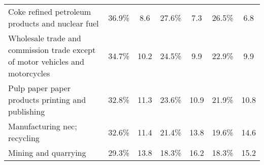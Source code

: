 \documentclass[10pt]{article}
\begin{document}
\begin{table}[!h]
{\begin{tabular}{l|cc|cc|cc}
\rowcolor[HTML]{FFFFFF} 
{\color[HTML]{333333} Coke refined petroleum products and nuclear fuel}                                   & {\color[HTML]{333333} 36.9\%}                                             & {\color[HTML]{333333} 8.6}                                           & {\color[HTML]{333333} 27.6\%}                                             & {\color[HTML]{333333} 7.3}                                           & {\color[HTML]{333333} 26.5\%}                                             & {\color[HTML]{333333} 6.8}                                           \\
\rowcolor[HTML]{FFFFFF} 
{\color[HTML]{333333} Wholesale trade and commission trade except of motor vehicles and motorcycles}      & {\color[HTML]{333333} 34.7\%}                                             & {\color[HTML]{333333} 10.2}                                          & {\color[HTML]{333333} 24.5\%}                                             & {\color[HTML]{333333} 9.9}                                           & {\color[HTML]{333333} 22.9\%}                                             & {\color[HTML]{333333} 9.9}                                           \\
\rowcolor[HTML]{FFFFFF} 
{\color[HTML]{333333} Pulp paper paper products printing and publishing}                                  & {\color[HTML]{333333} 32.8\%}                                             & {\color[HTML]{333333} 11.3}                                          & {\color[HTML]{333333} 23.6\%}                                             & {\color[HTML]{333333} 10.9}                                          & {\color[HTML]{333333} 21.9\%}                                             & {\color[HTML]{333333} 10.8}                                          \\
\rowcolor[HTML]{FFFFFF} 
{\color[HTML]{333333} Manufacturing nec; recycling}                                                       & {\color[HTML]{333333} 32.6\%}                                             & {\color[HTML]{333333} 11.4}                                          & {\color[HTML]{333333} 21.4\%}                                             & {\color[HTML]{333333} 13.8}                                          & {\color[HTML]{333333} 19.6\%}                                             & {\color[HTML]{333333} 14.6}                                          \\
\rowcolor[HTML]{FFFFFF} 
{\color[HTML]{333333} Mining and quarrying}                                                               & {\color[HTML]{333333} 29.3\%}                                             & {\color[HTML]{333333} 13.8}                                          & {\color[HTML]{333333} 18.3\%}                                             & {\color[HTML]{333333} 16.2}                                          & {\color[HTML]{333333} 18.3\%}                                             & {\color[HTML]{333333} 15.2}                                          \\

\end{tabular}}
\end{table}
\end{document}
